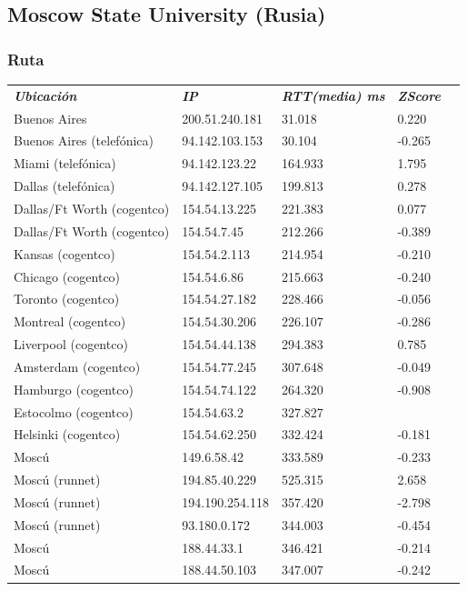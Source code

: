 \newpage

\subsection{Moscow State University (Rusia)}

\subsubsection{Ruta}

\begin{center}
\begin{tabular}{lllll}

	\textit{\textbf{Ubicaci\'on}}	&	\textit{\textbf{IP}}	&	\textit{\textbf{RTT(media) ms}}	&	\textit{\textbf{ZScore}}	\\
	Buenos Aires			&	200.51.240.181	&	31.018	&	0.220	\\
	Buenos Aires (telef\'onica)	&	94.142.103.153	&	30.104	&	-0.265	\\
	\intercontinental
	Miami (telef\'onica)		&	94.142.123.22	&	164.933	&	1.795	\\
	Dallas (telef\'onica)		&	94.142.127.105	&	199.813	&	0.278	\\
	Dallas/Ft Worth (cogentco)	&	154.54.13.225	&	221.383	&	0.077	\\
	Dallas/Ft Worth (cogentco)	&	154.54.7.45	&	212.266	&	-0.389	\\
	Kansas (cogentco)		&	154.54.2.113	&	214.954	&	-0.210	\\
	Chicago (cogentco)		&	154.54.6.86	&	215.663	&	-0.240	\\
	Toronto (cogentco)		&	154.54.27.182	&	228.466	&	-0.056	\\
	Montreal (cogentco)		&	154.54.30.206	&	226.107	&	-0.286	\\
	\intercontinental
	Liverpool (cogentco)		&	154.54.44.138	&	294.383	&	0.785	\\
	Amsterdam (cogentco)		&	154.54.77.245	&	307.648	&	-0.049	\\
	Hamburgo (cogentco)		&	154.54.74.122	&	264.320	&	-0.908	\\
	Estocolmo (cogentco)		&	154.54.63.2	&	327.827	&	\highestcontinental 0.713	\\
	Helsinki (cogentco)		&	154.54.62.250	&	332.424	&	-0.181	\\
	Mosc\'u				&	149.6.58.42	&	333.589	&	-0.233	\\
	Mosc\'u (runnet)		&	194.85.40.229	&	525.315	&	2.658	\\
	Mosc\'u (runnet)		&	194.190.254.118	&	357.420	&	-2.798	\\
	Mosc\'u (runnet)		&	93.180.0.172	&	344.003	&	-0.454	\\
	Mosc\'u				&	188.44.33.1	&	346.421	&	-0.214	\\
	Mosc\'u				&	188.44.50.103	&	347.007	&	-0.242	\\

\end{tabular}
\end{center}


